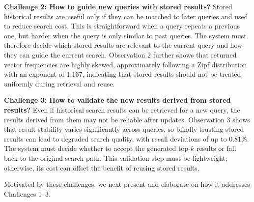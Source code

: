 \noindent\textbf{Challenge 2: How to guide new queries with stored results?}
Stored historical results are useful only if they can be matched to later queries and used to reduce search cost.
This is straightforward when a query repeats a previous one, but harder when the query is only similar to past queries.
The system must therefore decide which stored results are relevant to the current query and how they can guide the current search.
Observation 2 further shows that returned vector frequencies are highly skewed, approximately following a Zipf distribution with an exponent of 1.167, indicating that stored results should not be treated uniformly during retrieval and reuse.


\noindent\textbf{Challenge 3: How to validate the new results derived from stored results?}
Even if historical search results can be retrieved for a new query, the results derived from them may not be reliable after updates.
Observation 3 shows that result stability varies significantly across queries, so blindly trusting stored results can lead to degraded search quality, with recall deviations of up to 0.81\%.
The system must decide whether to accept the generated top-$k$ results or fall back to the original search path.
This validation step must be lightweight; otherwise, its cost can offset the benefit of reusing stored results.


Motivated by these challenges, we next present \system and elaborate on how it addresses Challenges 1--3.
